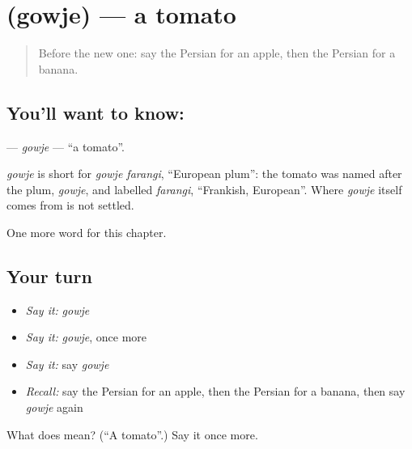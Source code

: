 \section[\texorpdfstring{\fa{گوجه} (gowje)}{گوجه (gowje)}]{ (gowje) — a tomato}

\label{lesson:FA-C41-gowje}



\begin{quote}
Before the new one: say the Persian for an apple, then the Persian for a banana.
\end{quote}

\subsection*{You'll want to know: }
\textbf{} — \emph{gowje} — \textquotedblleft{}a tomato\textquotedblright{}.

\begin{cousinweb}
\emph{gowje} is short for \emph{gowje farangi}, \textquotedblleft{}European plum\textquotedblright{}: the tomato was named after the plum, \emph{gowje}, and labelled \emph{farangi}, \textquotedblleft{}Frankish, European\textquotedblright{}. Where \emph{gowje} itself comes from is not settled.
\end{cousinweb}

\begin{grammarlens}[title={What you've built}]
One more word for this chapter.
\end{grammarlens}

\subsection*{Your turn}
\begin{itemize}
\raggedright
  \item \emph{Say it:} \emph{gowje}
  \item \emph{Say it:} \emph{gowje}, once more
  \item \emph{Say it:} say \emph{gowje}
  \item \emph{Recall:} say the Persian for an apple, then the Persian for a banana, then say \emph{gowje} again
\end{itemize}

\begin{tcolorbox}[breakable,colback=teal!4,colframe=teal!35!black,title={Before you move on}]
What does  mean? (\textquotedblleft{}A tomato\textquotedblright{}.) Say it once more.
\end{tcolorbox}
